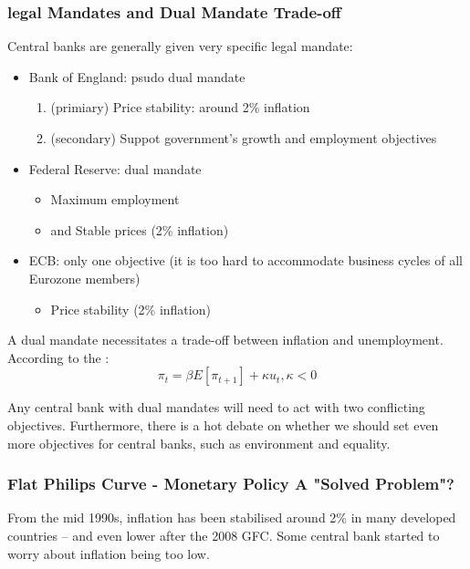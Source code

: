         \subsubsection{legal Mandates and Dual Mandate Trade-off}
            Central banks are generally given very specific legal mandate:
            \begin{itemize}
                \item Bank of England: psudo dual mandate
                \begin{enumerate}
                    \item (primiary) Price stability: around 2\% inflation
                    \item (secondary) Suppot government's growth and employment objectives
                \end{enumerate}
                \item Federal Reserve: dual mandate
                \begin{itemize}
                    \item Maximum employment
                    \item and Stable prices (2\% inflation)
                \end{itemize}
                \item ECB: only one objective (it is too hard to accommodate business cycles of all Eurozone members)
                    \begin{itemize}
                        \item Price stability (2\% inflation)
                    \end{itemize}
            \end{itemize}

            A dual mandate necessitates a trade-off between inflation and unemployment. According to the :
            $$\pi_t = \beta E[\pi_{t+1}]+\kappa u_t, \kappa<0$$
            
            Any central bank with dual mandates will need to act with two conflicting objectives. Furthermore, there is a hot debate on whether we should set even more objectives for central banks, such as environment and equality.
        
        \subsubsection{Flat Philips Curve - Monetary Policy A "Solved Problem"? }
            From the mid 1990s, inflation has been stabilised around 2\% in many developed countries -- and even lower after the 2008 GFC. Some central bank started to worry about inflation being too low.

